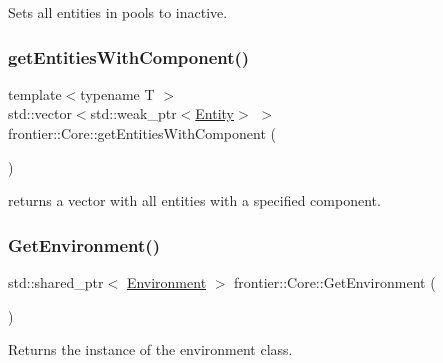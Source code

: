 Sets all entities in pools to inactive. 

\mbox{\label{classfrontier_1_1_core_a8c42c287ec4a96ff3be194f92e82c367}} 
\subsubsection{\texorpdfstring{get\+Entities\+With\+Component()}{getEntitiesWithComponent()}}
{\footnotesize\ttfamily template$<$typename T $>$ \\
std\+::vector$<$std\+::weak\+\_\+ptr$<$\hyperlink{classfrontier_1_1_entity}{Entity}$>$ $>$ frontier\+::\+Core\+::get\+Entities\+With\+Component (\begin{DoxyParamCaption}{ }\end{DoxyParamCaption})\hspace{0.3cm}{\ttfamily [inline]}}



returns a vector with all entities with a specified component. 

\mbox{\label{classfrontier_1_1_core_a38ded93a4688d58e6e3ef2cdd7694a7a}} 
\subsubsection{\texorpdfstring{Get\+Environment()}{GetEnvironment()}}
{\footnotesize\ttfamily std\+::shared\+\_\+ptr$<$ \hyperlink{classfrontier_1_1_environment}{Environment} $>$ frontier\+::\+Core\+::\+Get\+Environment (\begin{DoxyParamCaption}{ }\end{DoxyParamCaption})}



Returns the instance of the environment class. 

\mbox{\label{classfrontier_1_1_core_a30d2a3deec19493bba0e3a7a9d04a11b}} 
